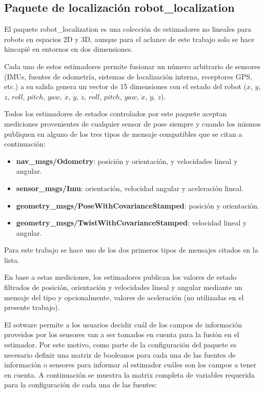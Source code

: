 
\subsection{Paquete de localización robot\_localization}\label{sec:robotLocalization}

El paquete robot\_localization es una colección de estimadores no lineales para robots en espacios 2D y 3D, aunque para el aclance de este trabajo solo se hace hincapié en entornos en dos dimensiones.

Cada uno de estos estimadores permite fusionar un número arbitrario de sensores (IMUs, fuentes de odometría, sistemas de localización interna, receptores GPS, etc.) a su salida genera un vector de 15 dimensiones con el estado del robot ($x$, $y$, $z$, $roll$, $pitch$, $yaw$, $\dot{x}$, $\dot{y}$, $\dot{z}$, $\dot{roll}$, $\dot{pitch}$, $\dot{yaw}$, $\ddot{x}$, $\ddot{y}$, $\ddot{z}$).

Todos los estimadores de estados controlados por este paquete aceptan mediciones provenientes de cualquier sensor de pose siempre y cuando los mismos publiquen en alguno de los tres tipos de mensaje compatibles que se citan a continuación:

\begin{itemize}
    \item \textbf{nav\_msgs/Odometry}: posición y orientación, y velocidades lineal y angular.
    \item \textbf{sensor\_msgs/Imu}: orientación, velocidad angular y aceleración lineal.
    \item \textbf{geometry\_msgs/PoseWithCovarianceStamped}: posición y orientación.
    \item \textbf{geometry\_msgs/TwistWithCovarianceStamped}: velocidad lineal y angular.
\end{itemize}

Para este trabajo se hace uso de los dos primeros tipos de mensajes citados en la lista.

En base a estas mediciones, los estimadores publican los valores de estado filtrados de posición, orientación y velocidades lineal y angular mediante un mensaje del tipo  y opcionalmente, valores de aceleración (no utilizadas en el presente trabajo).

El sotware permite a los usuarios decidir cuál de los campos de información proveidos por los sensores van a ser tomados en cuenta para la fusión en el estimador. Por este motivo, como parte de la configuración del paquete es necesario definir una matriz de booleanos para cada una de las fuentes de información o sensores para informar al estimador cuáles son los campos a tener en cuenta. A continuación se muestra la matrix completa de variables requerida para la configuración de cada una de las fuentes:

